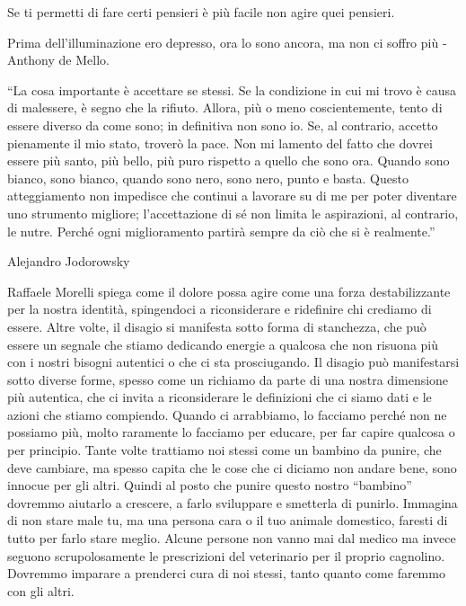 \documentclass[12pt]{book} %
\begin{document}
Se ti permetti di fare certi pensieri è più facile non agire quei pensieri.

Prima dell'illuminazione ero depresso, ora lo sono ancora, ma non ci soffro più - Anthony de Mello.

“La cosa importante è accettare se stessi. Se la condizione in cui mi trovo è causa di malessere, è segno che la
rifiuto. Allora, più o meno coscientemente, tento di essere diverso da come sono; in definitiva non sono io. Se, al
contrario, accetto pienamente il mio stato, troverò la pace. Non mi lamento del fatto che dovrei essere più santo, più
bello, più puro rispetto a quello che sono ora. Quando sono bianco, sono bianco, quando sono nero, sono nero, punto e
basta. Questo atteggiamento non impedisce che continui a lavorare su di me per poter diventare uno strumento migliore;
l'accettazione di sé non limita le aspirazioni, al contrario, le nutre. Perché ogni miglioramento
partirà sempre da ciò che si è realmente.” 

Alejandro Jodorowsky

Raffaele Morelli spiega come il dolore possa agire come una forza destabilizzante per la nostra identità, spingendoci a riconsiderare e ridefinire chi crediamo di essere. Altre volte, il disagio si manifesta sotto forma di stanchezza, che può essere un segnale che stiamo dedicando energie a qualcosa che non risuona più con i nostri bisogni autentici o che ci sta prosciugando. Il disagio può manifestarsi sotto diverse forme, spesso come un richiamo da parte di una nostra dimensione più autentica, che ci invita a riconsiderare le definizioni che ci siamo dati e le azioni che stiamo compiendo. Quando ci
arrabbiamo, lo facciamo perché non ne possiamo più, molto raramente lo facciamo per educare, per far capire qualcosa o per principio. Tante volte
trattiamo noi stessi come un bambino da punire, che deve cambiare, ma spesso capita che le cose che ci diciamo non
andare bene, sono innocue per gli altri. Quindi al posto che punire questo nostro “bambino” dovremmo aiutarlo a
crescere, a farlo sviluppare e smetterla di punirlo. 
Immagina di non stare male tu, ma una
persona cara o il tuo animale domestico, faresti di tutto per farlo stare meglio. Alcune persone non vanno mai dal
medico ma invece seguono scrupolosamente le prescrizioni del veterinario per il proprio cagnolino. Dovremmo imparare a
prenderci cura di noi stessi, tanto quanto come faremmo con gli altri.
\end{document}
